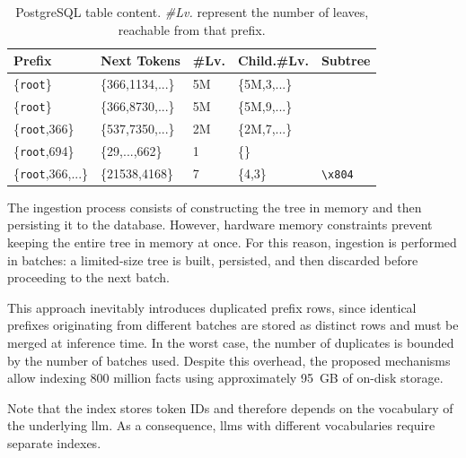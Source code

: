 \begin{table}[H]
    \centering
    \caption[PostgreSQL table content.]{PostgreSQL table content. \textit{\#Lv.} represent the number of leaves, reachable from that prefix.}
    \begin{tabular}{l|l|l|l|l}
    \toprule
    \textbf{Prefix} & \textbf{Next Tokens} & \textbf{\#Lv.} & \textbf{Child.\#Lv.} & \textbf{Subtree} \\
    \midrule
    \{\verb|root|\} & \{366,1134,...\} & 5M & \{5M,3,...\} & \\
    \{\verb|root|\} & \{366,8730,...\} & 5M & \{5M,9,...\} & \\
    \{\verb|root|,366\} & \{537,7350,...\} & 2M & \{2M,7,...\} & \\
    \{\verb|root|,694\} & \{29,...,662\} & 1 & \{\} & \\
    \{\verb|root|,366,...\} & \{21538,4168\} & 7 & \{4,3\} & \verb|\x804| \\
    \bottomrule
    \end{tabular}
    \label{tab:postgres-table}
    \end{table}


The ingestion process consists of constructing the tree in memory and then persisting it to the database. However, hardware memory constraints prevent keeping the entire tree in memory at once. For this reason, ingestion is performed in batches: a limited-size tree is built, persisted, and then discarded before proceeding to the next batch.

This approach inevitably introduces duplicated prefix rows, since identical prefixes originating from different batches are stored as distinct rows and must be merged at inference time. In the worst case, the number of duplicates is bounded by the number of batches used. Despite this overhead, the proposed mechanisms allow indexing 800 million facts using approximately 95~GB of on-disk storage.

Note that the index stores token IDs and therefore depends on the vocabulary of the underlying \ac{llm}. As a consequence, \acp{llm} with different vocabularies require separate indexes.










